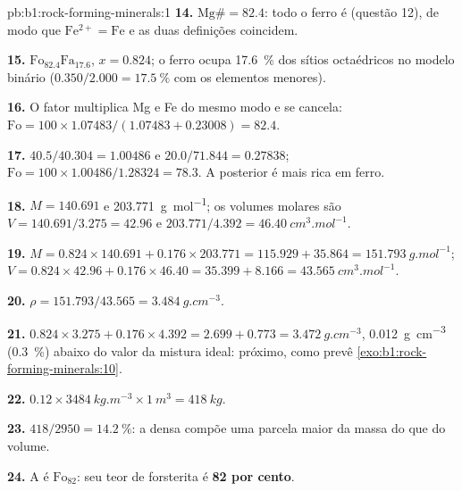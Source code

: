 \begin{solution}{pb:b1:rock-forming-minerals:1}
\textbf{14.} $\mathrm{Mg\#} = 82.4$: todo o ferro é 
(questão 12), de modo que $\mathrm{Fe^{2+}} = \mathrm{Fe}$ e as duas definições
coincidem.

\textbf{15.} $\text{Fo}_{82.4}\text{Fa}_{17.6}$, $x = 0.824$; o ferro ocupa
\qty{17.6}{\percent} dos sítios octaédricos no modelo binário
($0.350/2.000 = \qty{17.5}{\percent}$ com os elementos menores).

\textbf{16.} O fator multiplica Mg e Fe do mesmo modo e se cancela:
$\mathrm{Fo} = 100\times1.07483/(1.07483 + 0.23008) = 82.4$.

\textbf{17.} $40.5/40.304 = 1.00486$ e $20.0/71.844 = 0.27838$;
$\mathrm{Fo} = 100\times1.00486/1.28324 = 78.3$. A  posterior é mais rica
em ferro.

\textbf{18.} $M = 140.691$ e \qty{203.771}{g.mol^{-1}}; os volumes molares são
$V = 140.691/3.275 = 42.96$ e $203.771/4.392 =
\qty{46.40}{cm^3.mol^{-1}}$.

\textbf{19.} $M = 0.824\times140.691 + 0.176\times203.771 = 115.929 +
35.864 = \qty{151.793}{g.mol^{-1}}$; $V = 0.824\times42.96 +
0.176\times46.40 = 35.399 + 8.166 = \qty{43.565}{cm^3.mol^{-1}}$.

\textbf{20.} $\rho = 151.793/43.565 = \qty{3.484}{g.cm^{-3}}$.

\textbf{21.} $0.824\times3.275 + 0.176\times4.392 = 2.699 + 0.773 =
\qty{3.472}{g.cm^{-3}}$, \qty{0.012}{g.cm^{-3}} (\qty{0.3}{\percent}) abaixo do valor da mistura ideal: próximo, como prevê \cref{exo:b1:rock-forming-minerals:10}.

\textbf{22.} $0.12\times\qty{3484}{kg.m^{-3}}\times\qty{1}{m^3} =
\qty{418}{kg}$.

\textbf{23.} $418/2950 = \qty{14.2}{\percent}$: a  densa compõe uma
parcela maior da massa do que do volume.

\textbf{24.} A  é $\text{Fo}_{82}$: seu teor de forsterita é
\textbf{82 por cento}.
\end{solution}
